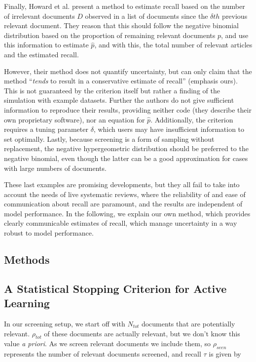 \documentclass{bmcart}
\begin{document}
	Finally, Howard et al. \cite{Howard2020} present a method to estimate recall based on the number of irrelevant documents $D$ observed in a list of documents since the $\delta th$ previous relevant document. 
	They reason that this should follow the negative binomial distribution based on the proportion of remaining relevant documents $p$, and use this information to estimate $\hat{p}$, and with this, the total number of relevant articles and the estimated recall.
	
	However, their method does not quantify uncertainty, but can only claim that the method ``\textit{tends} to result in a conservative estimate of recall'' (emphasis ours). This is not guaranteed by the criterion itself but rather a finding of the simulation with example datasets. Further the authors do not give sufficient information to reproduce their results, providing neither code (they describe their own proprietary software), nor an equation for $\hat{p}$. Additionally, the criterion requires a tuning parameter $\delta$, which users may have insufficient information to set optimally.
	Lastly, because screening is a form of sampling without replacement, the negative hypergeometric distribution should be preferred to the negative binomial, even though the latter can be a good approximation for cases with large numbers of documents.
	
	These last examples are promising developments, but they all fail to take into account the needs of live systematic reviews, where the reliability of and ease of communication about recall are paramount, and the results are independent of model performance. In the following, we explain our own method, which provides clearly communicable estimates of recall, which manage uncertainty in a way robust to model performance.
	
	\subsection*{Methods}
	
	\subsection*{A Statistical Stopping Criterion for Active Learning}
	
	In our screening setup, we start off with $N_{tot}$ documents that are potentially relevant. $\rho_{tot}$ of these documents are actually relevant, but we don't know this value \textit{a priori}. As we screen relevant documents we include them, so $\rho_{seen}$ represents the number of relevant documents screened, and recall $\tau$ is given by 
	
\end{document}
